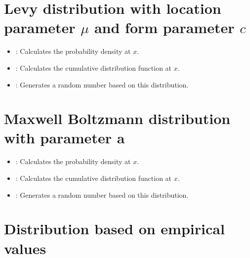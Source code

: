 \section{Levy distribution with location parameter \texorpdfstring{$\mu$}{mu} and form parameter \texorpdfstring{$c$}{c}}

\begin{itemize}

\item
{}:
Calculates the probability density at $x$.

\item
{}:
Calculates the cumulative distribution function at $x$.

\item
{}:
Generates a random number based on this distribution.

\end{itemize}



\section{Maxwell Boltzmann distribution with parameter a}

\begin{itemize}

\item
{}:
Calculates the probability density at $x$.

\item
{}:
Calculates the cumulative distribution function at $x$.

\item
{}:
Generates a random number based on this distribution.

\end{itemize}



\section{Distribution based on empirical values}

